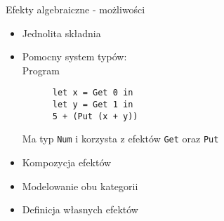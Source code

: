 \documentclass{beamer}
\begin{document}
\begin{frame}[fragile]{Efekty algebraiczne - możliwości}
  \begin{itemize}
    \item Jednolita składnia
    \item Pomocny system typów: \\
    Program
    \begin{Verbatim}
      let x = Get 0 in
      let y = Get 1 in
      5 + (Put (x + y))
    \end{Verbatim}
    Ma typ \texttt{Num} i korzysta z efektów \texttt{Get} oraz \texttt{Put}
    \item Kompozycja efektów
    \item Modelowanie obu kategorii
    \item Definicja własnych efektów
  \end{itemize}
\end{frame}
\end{document}
